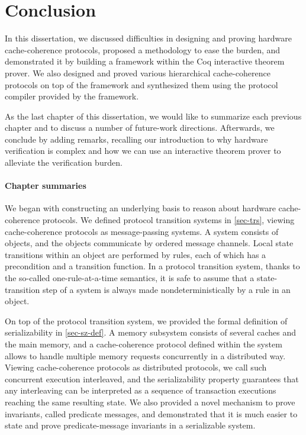 \chapter*{Conclusion}

In this dissertation, we discussed difficulties in designing and proving hardware cache-coherence protocols, proposed a methodology to ease the burden, and demonstrated it by building a framework \hemiola{} within the Coq interactive theorem prover.
We also designed and proved various hierarchical cache-coherence protocols on top of the framework and synthesized them using the protocol compiler provided by the framework.

As the last chapter of this dissertation, we would like to summarize each previous chapter and to discuss a number of future-work directions.
Afterwards, we conclude by adding remarks, recalling our introduction to why hardware verification is complex and how we can use an interactive theorem prover to alleviate the verification burden.

\subsubsection{Chapter summaries}

We began with constructing an underlying basis to reason about hardware cache-coherence protocols.
We defined protocol transition systems in \autoref{sec-trs}, viewing cache-coherence protocols as message-passing systems.
A system consists of objects, and the objects communicate by ordered message channels.
Local state transitions within an object are performed by rules, each of which has a precondition and a transition function.
In a protocol transition system, thanks to the so-called one-rule-at-a-time semantics, it is safe to assume that a state-transition step of a system is always made nondeterministically by a rule in an object.

On top of the protocol transition system, we provided the formal definition of serializability in \autoref{sec-sz-def}.
A memory subsystem consists of several caches and the main memory, and a cache-coherence protocol defined within the system allows to handle multiple memory requests concurrently in a distributed way.
Viewing cache-coherence protocols as distributed protocols, we call such concurrent execution interleaved, and the serializability property guarantees that any interleaving can be interpreted as a sequence of transaction executions reaching the same resulting state.
We also provided a novel mechanism to prove invariants, called predicate messages, and demonstrated that it is much easier to state and prove predicate-message invariants in a serializable system.

